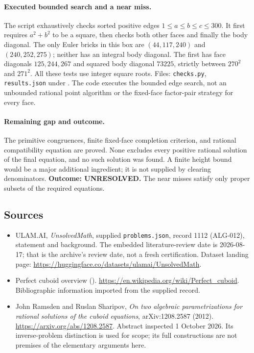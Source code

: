 \documentclass[11pt,a4paper]{article}
\begin{document}
\paragraph{Executed bounded search and a near miss.}
The script exhaustively checks sorted positive edges
$1\le a\le b\le c\le300$. It first requires $a^2+b^2$ to be a
square, then checks both other faces and finally the body diagonal.
The only Euler bricks in this box are $(44,117,240)$ and
$(240,252,275)$; neither has an integral body diagonal. The first has
face diagonals $125,244,267$ and squared body diagonal $73225$,
strictly between $270^2$ and $271^2$. All these tests use integer
square roots. Files: \texttt{checks.py}, \texttt{results.json} under
.
The code executes the bounded edge search, not an unbounded rational
point algorithm or the fixed-face factor-pair strategy for every face.

\paragraph{Remaining gap and outcome.}
The primitive congruences, finite fixed-face completion criterion, and
rational compatibility equation are proved. None excludes every
positive rational solution of the final equation, and no such solution
was found. A finite height bound would be a major additional ingredient;
it is not supplied by clearing denominators. \textbf{Outcome: UNRESOLVED.}
The near misses satisfy only proper subsets of the required equations.

\subsection{Sources}

{\small

\begin{itemize}

\item[\hypertarget{source:1112:1}{S1}] ULAM.AI, \emph{UnsolvedMath}, supplied \texttt{problems.json}, record 1112 (ALG-012), statement and background. The embedded literature-review date is 2026-08-17; that is the archive’s review date, not a fresh certification. Dataset landing page: \url{https://huggingface.co/datasets/ulamai/UnsolvedMath}.

\item[\hypertarget{source:1112:2}{S2}] Perfect cuboid overview (). \url{https://en.wikipedia.org/wiki/Perfect_cuboid}. Bibliographic information imported from the supplied record.


\item[E1] John Ramsden and Ruslan Sharipov,
\emph{On two algebraic parametrizations for rational solutions of the
cuboid equations}, arXiv:1208.2587 (2012).
\url{https://arxiv.org/abs/1208.2587}. Abstract inspected 1 October 2026.
Its inverse-problem distinction is used for scope; its full constructions
are not premises of the elementary arguments here.

\end{itemize}

}

\label{end:1112}
\end{document}
